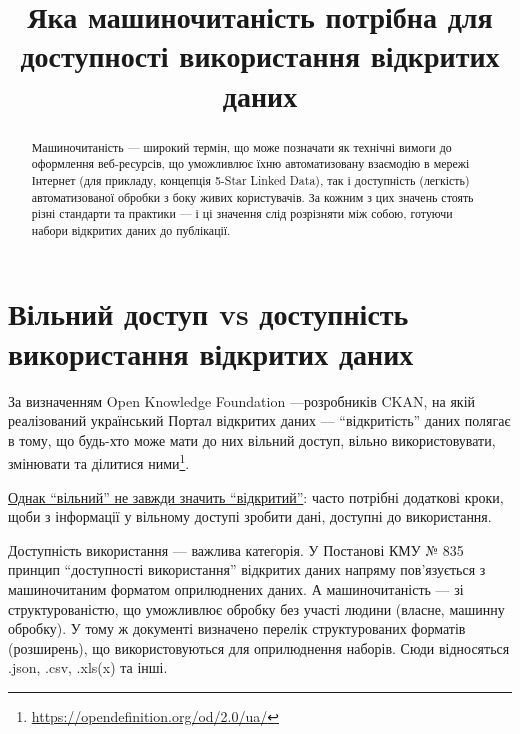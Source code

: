 \documentclass[
]{agujournal2019}
\begin{document}
\title{Яка машиночитаність потрібна для доступності використання
відкритих даних}



\begin{abstract}
Машиночитаність --- широкий термін, що може позначати як технічні вимоги
до оформлення веб-ресурсів, що уможливлює їхню автоматизовану взаємодію
в мережі Інтернет (для прикладу, концепція 5-Star Linked Data), так і
доступність (легкість) автоматизованої обробки з боку живих
користувачів. За кожним з цих значень стоять різні стандарти та практики
--- і ці значення слід розрізняти між собою, готуючи набори відкритих
даних до публікації.
\end{abstract}





\section{Вільний доступ vs доступність використання відкритих
даних}\label{ux432ux456ux43bux44cux43dux438ux439-ux434ux43eux441ux442ux443ux43f-vs-ux434ux43eux441ux442ux443ux43fux43dux456ux441ux442ux44c-ux432ux438ux43aux43eux440ux438ux441ux442ux430ux43dux43dux44f-ux432ux456ux434ux43aux440ux438ux442ux438ux445-ux434ux430ux43dux438ux445}

За визначенням Open Knowledge Foundation ---розробників CKAN, на якій
реалізований український Портал відкритих даних --- ``відкритість''
даних полягає в тому, що будь-хто може мати до них вільний доступ,
вільно використовувати, змінювати та ділитися ними\footnote{\url{https://opendefinition.org/od/2.0/ua/}}.

\href{https://aims.gitbook.io/open-data-mooc/unit-1-open-data-principles/lesson-1.1-what-is-open-data\#id-5.-challenges}{Однак
``вільний'' не завжди значить ``відкритий''}: часто потрібні додаткові
кроки, щоби з інформації у вільному доступі зробити дані, доступні до
використання.

Доступність використання --- важлива категорія. У Постанові КМУ № 835
принцип ``доступності використання'' відкритих даних напряму
пов'язується з машиночитаним форматом оприлюднених даних. А
машиночитаність --- зі структурованістю, що уможливлює обробку без
участі людини (власне, машинну обробку). У тому ж документі визначено
перелік структурованих форматів (розширень), що використовуються для
оприлюднення наборів. Сюди відносяться .json, .csv, .xls(x) та інші.
\end{document}
